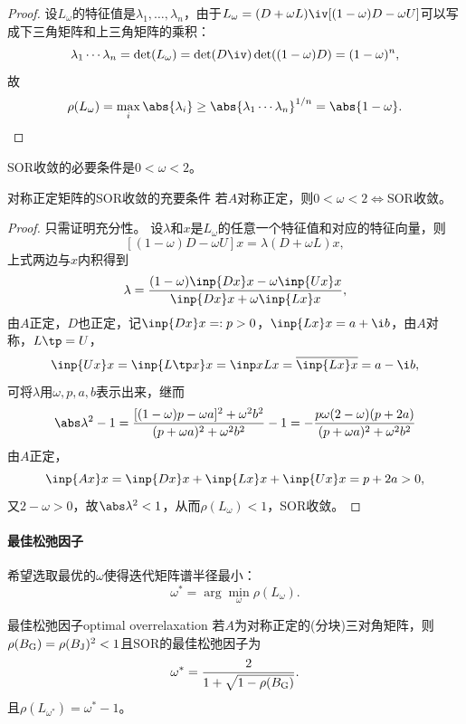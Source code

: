 \begin{proof}
    设$L_\omega$的特征值是$\lambda_1,\ldots,\lambda_n$，由于$L_\omega=(D+\omega L)\iv[(1-\omega)D-\omega U]$可以写成下三角矩阵和上三角矩阵的乘积：
    \[
        \lambda_1\cdots\lambda_n=\det(L_\omega)=\det(D\iv)\det((1-\omega)D)=(1-\omega)^n,
    \]
    故
    \[
        \rho(L_\omega)=\max_i\abs{\lambda_i}\geq\abs{\lambda_1\cdots\lambda_n}^{1/n}=\abs{1-\omega}.
        \qedhere
    \]
\end{proof}

\begin{corollary}
    SOR收敛的必要条件是$0<\omega<2$。
\end{corollary}

\begin{theorem}
    {对称正定矩阵的SOR收敛的充要条件}{}
    若$A$对称正定，则$0<\omega<2\iff$SOR收敛。
\end{theorem}

\begin{proof}
    只需证明充分性。
    设$\lambda$和$x$是$L_\omega$的任意一个特征值和对应的特征向量，则
    \[
        [(1-\omega)D-\omega U]x=\lambda(D+\omega L)x,
    \]
    上式两边与$x$内积得到
    \[
        \lambda=\frac{(1-\omega)\inp{Dx}x-\omega\inp{Ux}x}{\inp{Dx}x+\omega\inp{Lx}x},
    \]
    由$A$正定，$D$也正定，记$\inp{Dx}x=:p>0$，$\inp{Lx}x=a+\i b$，由$A$对称，$L\tp=U$，
    \[
        \inp{Ux}x=\inp{L\tp x}x=\inp x{Lx}=\overline{\inp{Lx}x}=a-\i b,
    \]
    可将$\lambda$用$\omega,p,a,b$表示出来，继而
    \[
        \abs\lambda^2-1=\frac{[(1-\omega)p-\omega a]^2+\omega^2b^2}{(p+\omega a)^2+\omega^2b^2}-1=-\frac{p\omega(2-\omega)(p+2a)}{(p+\omega a)^2+\omega^2b^2}
    \]
    由$A$正定，
    \[
        \inp{Ax}x=\inp{Dx}x+\inp{Lx}x+\inp{Ux}x=p+2a>0,
    \]
    又$2-\omega>0$，故$\abs\lambda^2<1$，从而$\rho(L_\omega)<1$，SOR收敛。
\end{proof}

\paragraph{最佳松弛因子}

希望选取最优的$\omega$使得迭代矩阵谱半径最小：
\begin{equation}
    \omega^*=\arg\min_{\omega}\rho(L_\omega).
\end{equation}

\begin{theorem}
    {最佳松弛因子}{optimal overrelaxation}
    若$A$为对称正定的(分块)三对角矩阵，则$\rho(B_\text G)=\rho(B_\text J)^2<1$且SOR的最佳松弛因子为
    \begin{equation}
        \omega^*=\frac2{1+\sqrt{1-\rho(B_\text G)}}.
    \end{equation}
    且$\rho(L_{\omega^*})=\omega^*-1$。
\end{theorem}

